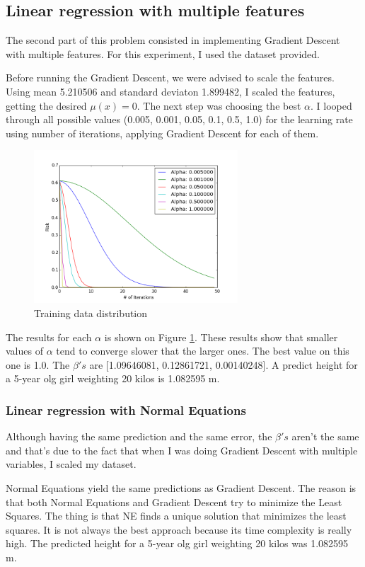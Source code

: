 \documentclass{article}
\begin{document}
\subsection{Linear regression with multiple features}
The second part of this problem consisted in implementing Gradient Descent with multiple features. For this experiment, I used the  dataset provided.

Before running the Gradient Descent, we were advised to scale the features. Using mean 5.210506 and standard deviaton 1.899482, I scaled the features, getting the desired $\mu(x) = 0$. The next step was choosing the best $\alpha$. I looped through all possible values (0.005, 0.001, 0.05, 0.1, 0.5, 1.0) for the learning rate using number of iterations, applying Gradient Descent for each of them.

\begin{figure}[htb]
    \centering
    \includegraphics[width=3.0in]{p1_alpha_convergence}
    \caption{Training data distribution}
    \label{costfunction}
\end{figure}

The results for each $\alpha$ is shown on Figure \ref{costfunction}. These results show that smaller values of $\alpha$ tend to converge slower that the larger ones. The best value on this one is 1.0. The $\beta's$ are [1.09646081, 0.12861721, 0.00140248]. A predict height for a 5-year olg girl weighting 20 kilos is 1.082595 m.

\subsubsection{Linear regression with Normal Equations}
Although having the same prediction and the same error, the $\beta's$ aren't the same and that's due to the fact that when I was doing Gradient Descent with multiple variables, I scaled my dataset.

Normal Equations yield the same predictions as Gradient Descent. The reason is that both Normal Equations and Gradient Descent try to minimize the Least Squares. The thing is that NE finds a unique solution that minimizes the least squares. It is not always the best approach because its time complexity is really high. The predicted height for a 5-year olg girl weighting 20 kilos was 1.082595 m.
\end{document}
